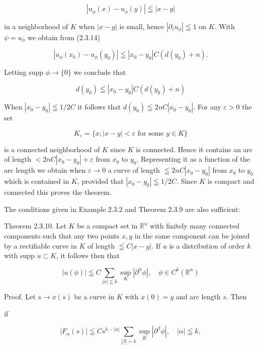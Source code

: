 \[
\left|u_{\dot{\phi}}(x)-u_{\dot{\phi}}(y)\right| \leqq|x-y|
\]

in a neighborhood of $K$ when $|x-y|$ is small, hence $\left|\partial_{i} u_{\phi}\right| \leqq 1$ on $K$. With $\psi=u_{\phi}$ we obtain from (2.3.14)

\[
\left|u_{\phi}\left(x_{0}\right)-u_{\phi}\left(y_{0}\right)\right| \leqq\left|x_{0}-y_{0}\right| C\left(d\left(y_{0}\right)+n\right) .
\]

Letting supp $\phi \rightarrow\{0\}$ we conclude that

\[
d\left(y_{0}\right) \leqq\left|x_{0}-y_{0}\right| C\left(d\left(y_{0}\right)+n\right)
\]

When $\left|x_{0}-y_{0}\right| \leqq 1 / 2 C$ it follows that $d\left(y_{0}\right) \leqq 2 n C\left|x_{0}-y_{0}\right|$. For any $\varepsilon>0$ the set

\[
K_{\varepsilon}=\{x ;|x-y|<\varepsilon \text { for some } y \in K\}
\]

is a connected neighborhood of $K$ since $K$ is connected. Hence it contains an arc of length $<2 n C\left|x_{0}-y_{0}\right|+\varepsilon$ from $x_{0}$ to $y_{0}$. Representing it as a function of the arc length we obtain when $\varepsilon \rightarrow 0$ a curve of length $\leqq 2 n C\left|x_{0}-y_{0}\right|$ from $x_{0}$ to $y_{0}$ which is contained in $K$, provided that $\left|x_{0}-y_{0}\right| \leqq 1 / 2 C$. Since $K$ is compact and connected this proves the theorem.

The conditions given in Example 2.3.2 and Theorem 2.3.9 are also sufficient:

Theorem 2.3.10. Let $K$ be a compact set in $\mathbb{R}^{n}$ with finitely many connected components such that any two points $x, y$ in the same component can be joined by a rectifiable curve in $K$ of length $\leqq C|x-y|$. If $u$ is a distribution of order $k$ with supp $u \subset K$, it follows then that


\begin{equation*}
|u(\phi)| \leqq C \sum_{|\alpha| \leqq k} \sup _{K}\left|\partial^{\alpha} \phi\right|, \quad \phi \in C^{k}\left(\mathbb{R}^{n}\right) \tag{2.3.16}
\end{equation*}


Proof. Let $s \rightarrow x(s)$ be a curve in $K$ with $x(0)=y$ and arc length $s$. Then

if


\begin{equation*}
\left|F_{\alpha}(s)\right| \leqq C s^{k-|\alpha|} \sum_{|\beta|=k} \sup _{K}\left|\partial^{\beta} \phi\right|, \quad|\alpha| \leqq k, \tag{2.3.17}
\end{equation*}


